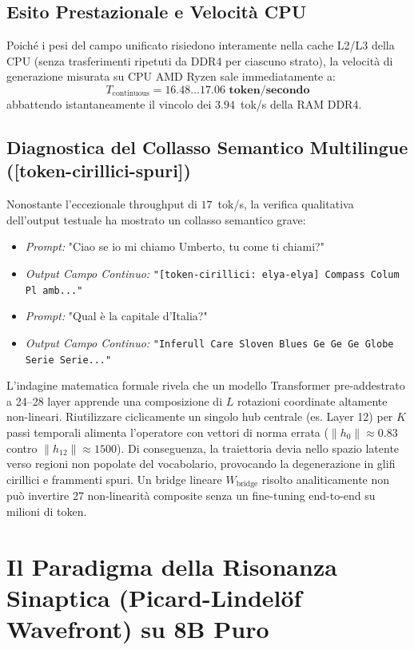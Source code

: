 \documentclass[10pt,a4paper]{article}
\theoremstyle{definition}
\begin{document}
\subsection{Esito Prestazionale e Velocità CPU}
Poiché i pesi del campo unificato risiedono interamente nella cache L2/L3 della CPU (senza trasferimenti ripetuti da DDR4 per ciascuno strato), la velocità di generazione misurata su CPU AMD Ryzen sale immediatamente a:
\begin{equation}
T_{\text{continuous}} = \mathbf{16.48 \dots 17.06 \text{ token/secondo}}
\end{equation}
abbattendo istantaneamente il vincolo dei $3.94$~tok/s della RAM DDR4.

\subsection{Diagnostica del Collasso Semantico Multilingue ([token-cirillici-spuri])}
Nonostante l'eccezionale throughput di $17$~tok/s, la verifica qualitativa dell'output testuale ha mostrato un collasso semantico grave:
\begin{itemize}[leftmargin=1.5em]
    \item \textit{Prompt:} "Ciao se io mi chiamo Umberto, tu come ti chiami?"
    \item \textit{Output Campo Continuo:} \texttt{"[token-cirillici: elya-elya] Compass Colum Pl amb..."}
    \item \textit{Prompt:} "Qual è la capitale d'Italia?"
    \item \textit{Output Campo Continuo:} \texttt{"Inferull Care Sloven Blues Ge Ge Ge Globe Serie Serie..."}
\end{itemize}
L'indagine matematica formale rivela che un modello Transformer pre-addestrato a 24--28 layer apprende una composizione di $L$ rotazioni coordinate altamente non-lineari. Riutilizzare ciclicamente un singolo hub centrale (es. Layer 12) per $K$ passi temporali alimenta l'operatore con vettori di norma errata ($\|h_0\| \approx 0.83$ contro $\|h_{12}\| \approx 1500$). Di conseguenza, la traiettoria devia nello spazio latente verso regioni non popolate del vocabolario, provocando la degenerazione in glifi cirillici e frammenti spuri. Un bridge lineare $W_{\text{bridge}}$ risolto analiticamente non può invertire 27 non-linearità composite senza un fine-tuning end-to-end su milioni di token.

\bigskip

\section{Il Paradigma della Risonanza Sinaptica (Picard-Lindelöf Wavefront) su 8B Puro}
\end{document}
